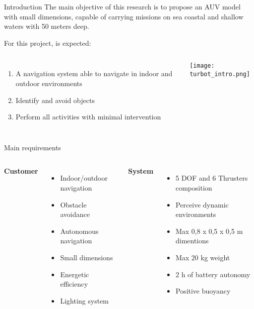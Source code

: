 \begin{frame}[t]{Introduction}    
  \transdissolve[duration=0.5]
  The main objective of this research is to propose an AUV model with small dimensions, capable of carrying missions on sea coastal and shallow waters with 50 meters deep. 

  For this project, is expected: 
  \newline
  \begin{columns}[c]
      \begin{enumerate}
        \item A navigation system able to navigate in indoor and outdoor environments
        \item Identify and avoid objects
        \item Perform all activities with minimal intervention
      \end{enumerate}
      \texttt{[image: turbot\_intro.png]}
  \end{columns}

\end{frame}
\begin{frame}[t]{Main requirements}
  \transdissolve[duration=0.5]
  \begin{columns}[c]
      \textbf{Customer}
      \begin{itemize}
        \item Indoor/outdoor navigation
        \item Obstacle avoidance
        \item Autonomous navigation
        \item Small dimensions
        \item Energetic efficiency
        \item Lighting system
      \end{itemize}
      \textbf{System}
      \begin{itemize}
        \item 5 DOF and 6 Thrusters composition
        \item Perceive dynamic environments
        \item Max 0,8 x 0,5 x 0,5 m dimentions
        \item Max 20 kg weight
        \item 2 h of battery autonomy
        \item Positive buoyancy
      \end{itemize}
  \end{columns}
\end{frame}

